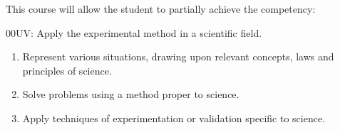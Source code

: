 {This course will allow the student to partially achieve the competency:

00UV: Apply the experimental method in a scientific field.
\begin{enumerate}
\item Represent various situations, drawing upon relevant concepts, laws and principles of science.
\item Solve problems using a method proper to science.
\item Apply techniques of experimentation or validation specific to science.
\end{enumerate}


}
